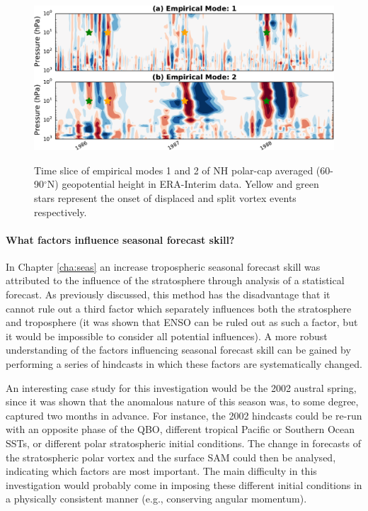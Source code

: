 \begin{figure}[t]
  \centering
  \noindent\includegraphics[width=\textwidth,angle=0]{figures/chapter-conclusions/EMD2.pdf}\\
  \caption[EMD timeseries]{Time slice of empirical modes 1 and 2 of NH polar-cap
    averaged (60-90$^{\circ}$N) geopotential height in ERA-Interim data. Yellow
    and green stars represent the onset of displaced and split vortex events
    respectively.}\label{fig:emd}
\end{figure}


\paragraph{What factors influence seasonal forecast skill?} In Chapter
\ref{cha:seas} an increase tropospheric seasonal forecast skill was attributed
to the influence of the stratosphere through analysis of a statistical
forecast. As previously discussed, this method has the disadvantage that it
cannot rule out a third factor which separately influences both the stratosphere
and troposphere (it was shown that ENSO can be ruled out as such a factor, but
it would be impossible to consider all potential influences). A more robust
understanding of the factors influencing seasonal forecast skill can be gained
by performing a series of hindcasts in which these factors are systematically
changed.

An interesting case study for this investigation would be the 2002 austral
spring, since it was shown that the anomalous nature of this season was, to some
degree, captured two months in advance. For instance, the 2002 hindcasts could
be re-run with an opposite phase of the QBO, different tropical Pacific or
Southern Ocean SSTs, or different polar stratospheric initial conditions. The
change in forecasts of the stratospheric polar vortex and the surface SAM could
then be analysed, indicating which factors are most important. The main
difficulty in this investigation would probably come in imposing these different
initial conditions in a physically consistent manner (e.g., conserving angular
momentum).

